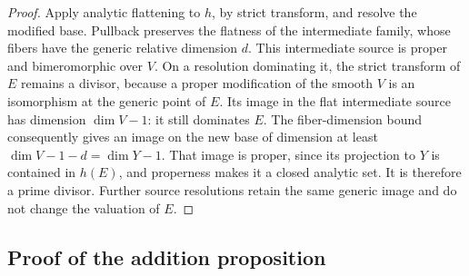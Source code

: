 \begin{proof}
Apply analytic flattening to \(h\), by strict transform, and resolve
the modified base.  Pullback preserves the flatness of the intermediate
family, whose fibers have the generic relative dimension \(d\).
This intermediate source is proper and bimeromorphic over \(V\).
On a resolution dominating it, the strict transform of \(E\) remains
a divisor, because a proper modification of the smooth \(V\) is an
isomorphism at the generic point of \(E\).  Its image in the flat
intermediate source has dimension \(\dim V-1\): it still dominates
\(E\).  The fiber-dimension bound consequently gives an image on the
new base of dimension at least
\(\dim V-1-d=\dim Y-1\).
That image is proper, since its projection to \(Y\) is contained in
\(h(E)\), and properness makes it a closed analytic set.  It is
therefore a prime divisor.  Further source resolutions retain the
same generic image and do not change the valuation of \(E\).
\end{proof}

\subsection{Proof of the addition proposition}

